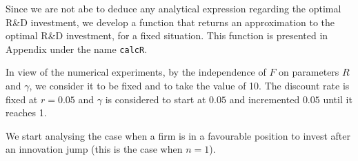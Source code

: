 Since we are not abe to deduce any analytical expression regarding the optimal R\&D investment, we develop a function that returns an approximation to the optimal R\&D investment, for a fixed situation. This function is presented in Appendix under the name \texttt{calcR}.

In view of the numerical experiments, by the independence of $F$ on parameters $R$ and $\gamma$, we consider it to be fixed and to take the value of 10. The discount rate is fixed at $r=0.05$ and $\gamma$ is considered to start at $0.05$ and incremented $0.05$ until it reaches 1.




We start analysing the case when a firm is in a favourable position to invest after an innovation jump (this is the case when $n=1$).

